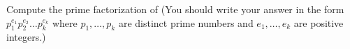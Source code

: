 Compute the prime factorization of   (You should write your answer in the form $p_1^{e_1}p_2^{e_2}\ldots p_k^{e_k}$ where $p_1,\ldots,p_k$ are distinct prime numbers and $e_1,\ldots,e_k$ are positive integers.)